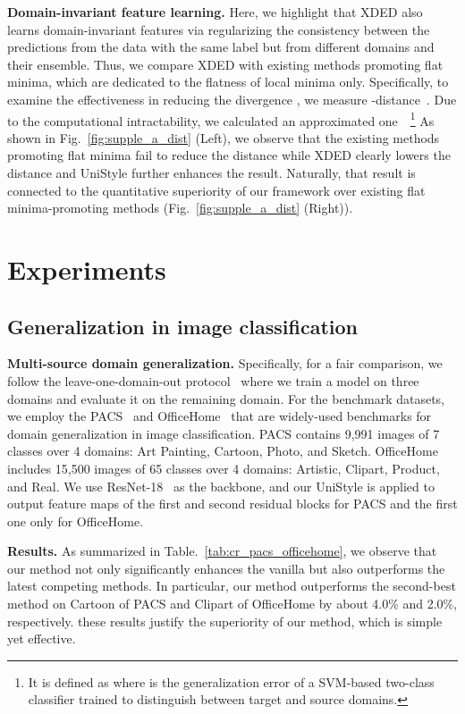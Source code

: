 \documentclass[runningheads]{llncs}
\begin{document}
\noindent \textbf{Domain-invariant feature learning.} 
Here, we highlight that XDED also learns domain-invariant features via regularizing the consistency between the predictions from the data with the same label but from different domains and their ensemble. Thus, we compare XDED with existing methods promoting flat minima, which are dedicated to the flatness of local minima only. Specifically, to examine the effectiveness in reducing the divergence , we measure -distance~\cite{ben2010theory,kifer2004detecting}. Due to the computational intractability, we calculated an approximated one~\cite{long2015learning,nam2021reducing}~\footnote{It is defined as  where  is the generalization error of a SVM-based two-class classifier trained to distinguish between target and source domains.}
As shown in Fig.~\ref{fig:supple_a_dist} (Left), we observe that the existing methods promoting flat minima fail to reduce the distance while XDED clearly lowers the distance and UniStyle further enhances the result. Naturally, that result is connected to the quantitative superiority of our framework over existing flat minima-promoting methods (Fig.~\ref{fig:supple_a_dist} (Right)). 
 \section{Experiments}
\label{experiments}
\subsection{Generalization in image classification}
\label{dg_cls}

\noindent \textbf{Multi-source domain generalization.}
Specifically, for a fair comparison, we follow the leave-one-domain-out protocol~\cite{li2017deeper} where we train a model on three domains and evaluate it on the remaining domain. For the benchmark datasets, we employ the PACS~\cite{li2017deeper} and OfficeHome~\cite{venkateswara2017deep} that are widely-used benchmarks for domain generalization in image classification. PACS contains 9,991 images of 7 classes over 4 domains: Art Painting, Cartoon, Photo, and Sketch. OfficeHome includes 15,500 images of 65 classes over 4 domains: Artistic, Clipart, Product, and Real. We use ResNet-18~\cite{resnet} as the backbone, and our UniStyle is applied to output feature maps of the first and second residual blocks for PACS and the first one only for OfficeHome.

\noindent \textbf{Results.}
As summarized in Table.~\ref{tab:cr_pacs_officehome}, we observe that our method not only significantly enhances the vanilla but also outperforms the latest competing methods. In particular, our method outperforms the second-best method on Cartoon of PACS and Clipart of OfficeHome by about 4.0\% and 2.0\%, respectively. these results justify the superiority of our method, which is simple yet effective.
\end{document}
